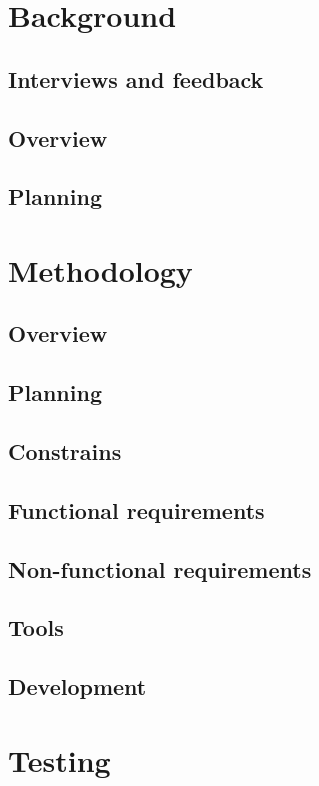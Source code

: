 \documentclass{article}
\begin{document}
  \newpage
  \section{Background}
  \subsection{Interviews and feedback}

  \subsection{Overview}
  \subsection{Planning}
  

  \newpage
  \section{Methodology}
  \subsection{Overview}
  \subsection{Planning}
  \subsection{Constrains}
  \subsection{Functional requirements}
  \subsection{Non-functional requirements}
  \subsection{Tools}
  \subsection{Development}

  \newpage
  \section{Testing}
\end{document}
